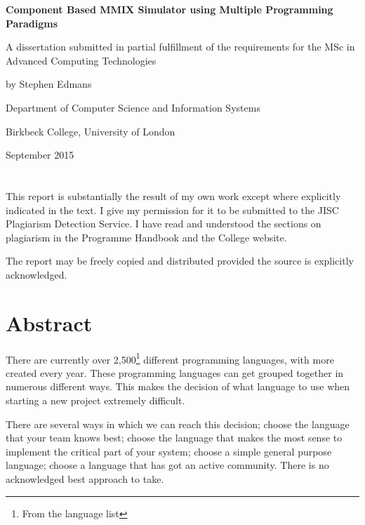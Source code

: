 \documentclass[a4paper,11pt]{report}
\begin{document}
\begin{titlepage}
	\centering
	{\bfseries Component Based MMIX Simulator using Multiple Programming Paradigms \par}
	\vspace{1cm}
	{A dissertation submitted in partial fulfillment of the requirements for the MSc in Advanced Computing Technologies\par}
	\vspace{1.5cm}
	{by Stephen Edmans\par}
	\vspace{2cm}
	{Department of Computer Science and Information Systems\par}
	{Birkbeck College, University of London\par}
	\vspace{2cm}
	{\large September 2015\par}
\end{titlepage}
\newpage
\chapter*{} %
{This report is substantially the result of my own work except where explicitly
indicated in the text. I give my permission for it to be submitted to the JISC
Plagiarism Detection Service. I have read and understood the sections on plagiarism
in the Programme Handbook and the College website.\par}
\vspace{1cm}
{\noindent The report may be freely copied and distributed provided the source is explicitly
acknowledged.}
\chapter*{Abstract}

There are currently over 2,500\footnote{From the language list\cite{numlangs}} different programming languages, with more created every year. These programming languages can get grouped together in numerous different ways.  This makes the decision of what language to use when starting a new project extremely difficult.

There are several ways in which we can reach this decision; choose the language that your team knows best; choose the language that makes the most sense to implement the critical part of your system; choose a simple general purpose language; choose a language that has got an active community. There is no acknowledged best approach to take.
\end{document}
